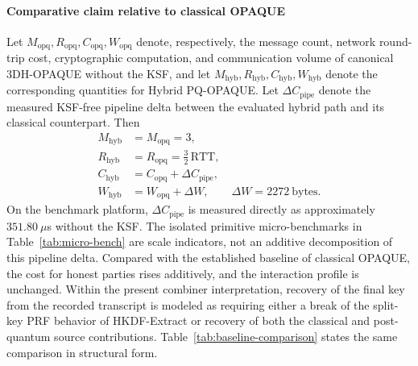 \documentclass[preprint,12pt]{elsarticle}
\theoremstyle{remark}
\begin{document}
\paragraph{Comparative claim relative to classical OPAQUE}
Let $M_{\mathrm{opq}}, R_{\mathrm{opq}}, C_{\mathrm{opq}}, W_{\mathrm{opq}}$
denote, respectively, the message count, network round-trip cost,
cryptographic computation, and communication volume of canonical
3DH-OPAQUE without the KSF, and let
$M_{\mathrm{hyb}}, R_{\mathrm{hyb}}, C_{\mathrm{hyb}}, W_{\mathrm{hyb}}$
denote the corresponding quantities for Hybrid PQ-OPAQUE. Let
$\Delta C_{\mathrm{pipe}}$ denote the measured KSF-free pipeline delta
between the evaluated hybrid path and its classical counterpart. Then
\[
  \begin{aligned}
    M_{\mathrm{hyb}} &= M_{\mathrm{opq}} = 3,\\
    R_{\mathrm{hyb}} &= R_{\mathrm{opq}} = \tfrac{3}{2}\,\mathrm{RTT},\\
    C_{\mathrm{hyb}} &= C_{\mathrm{opq}} + \Delta C_{\mathrm{pipe}},\\
    W_{\mathrm{hyb}} &= W_{\mathrm{opq}} + \Delta W,\qquad
      \Delta W = 2272~\text{bytes}.
  \end{aligned}
\]
On the benchmark platform, $\Delta C_{\mathrm{pipe}}$ is measured directly
as approximately $351.80~\mu$s without the KSF. The isolated primitive
micro-benchmarks in Table~\ref{tab:micro-bench} are scale indicators, not an
additive decomposition of this pipeline delta. Compared with the established
baseline of classical OPAQUE, the
cost for honest parties rises additively, and the interaction profile is
unchanged. Within the present combiner interpretation, recovery of the
final key from the recorded transcript is modeled as requiring either a
break of the split-key PRF behavior of HKDF-Extract or recovery of both the
classical and post-quantum source contributions.
Table~\ref{tab:baseline-comparison} states the same comparison in
structural form.
\end{document}
